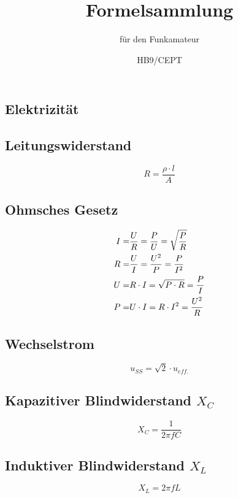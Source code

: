 \documentclass[10pt,landscape]{scrartcl}
\author{HB9/CEPT}
\date{}
\title{Formelsammlung}
\subtitle{f\"ur den Funkamateur}
\begin{document}
\setlength{\columnseprule}{.25pt}
\setlength{\columnsep}{2cm}
\begin{multicols}{3}

\maketitle

\section{Elektrizität}

\noindent
{}

\subsection*{Leitungswiderstand}

$$ R = \frac{\rho \cdot l}{A} $$

\subsection*{Ohmsches Gesetz}

\begin{align*}
I =& \frac{U}{R} = \frac{P}{U} = \sqrt{P \over R} \\
R =& \frac{U}{I} = \frac{U^2}{P} = \frac{P}{I^2} \\
U =& R \cdot I = \sqrt{P\cdot R} = \frac{P}{I} \\
P =& U \cdot I = R \cdot I^2 = \frac{U^2}{R}
\end{align*}

\subsection*{Wechselstrom}

$$ u_{SS} = \sqrt{2}\cdot u_{eff.} $$

\subsection*{Kapazitiver Blindwiderstand $X_C$}
$$ X_C = \frac{1}{2 \pi f C} $$

\subsection*{Induktiver Blindwiderstand $X_L$}
$$ X_L = 2 \pi f L $$


\end{multicols}
\end{document}
